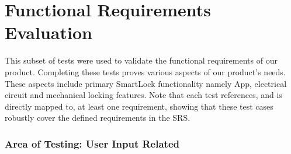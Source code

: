 \documentclass[12pt, titlepage]{article}
\begin{document}
\section{Functional Requirements Evaluation}

This subset of tests were used to validate the functional requirements of our product. Completing these tests proves various aspects of our product's needs. These aspects include primary SmartLock functionality namely App, electrical circuit and mechanical locking features. Note that each test references, and is directly mapped to, at least one requirement, showing that these test cases robustly cover the defined requirements in the SRS.

\subsubsection{Area of Testing: User Input Related}
\end{document}

